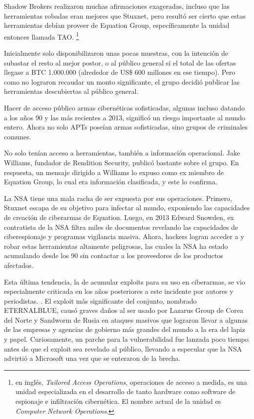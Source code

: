\documentclass{article}
\begin{document}
Shadow Brokers realizaron muchas afirmaciones exageradas, incluso que las herramientas robadas eran mejores que Stuxnet, pero resultó ser cierto que estas herramientas debían proveer de Equation Group, específicamente la unidad entonces llamada TAO. \footnote{en inglés, {\it Tailored Access Operations}, operaciones de acceso a medida, es una unidad especializada en el desarrollo de tanto hardware como software de espionaje e infiltración cibernética. El nombre actual de la unidad es {\it Computer Network Operations}.} \autocite{sophos-shadow-brokers}

Inicialmente solo disponibilizaron unas pocas muestras, con la intención de subastar el resto al mejor postor, o al público general si el total de las ofertas llegase a BTC 1.000.000 (alrededor de US\$ 600 millones en ese tiempo). Pero como no lograron recaudar un monto significante, el grupo decidió publicar las herramientas descubiertas al público general.

Hacer de acceso público armas cibernéticas sofisticadas, algunas incluso datando a los años 90 y las más recientes a 2013, significó un riesgo importante al mundo entero. Ahora no solo APTs poseían armas sofisticadas, sino grupos de criminales comunes.

No solo tenían acceso a herramientas, también a información operacional. Jake Williams, fundador de Rendition Security, publicó bastante sobre el grupo. En respuesta, un mensaje dirigido a Williams lo expuso como ex miembro de Equation Group, lo cual era información clasificada, y este lo confirma. \autocite{nytimes-shadow-brokers} \autocite{darknetdiaries-shadow-brokers}

La NSA tiene una mala racha de ser expuesta por sus operaciones. Primero, Stuxnet escapa de su objetivo para infectar al mundo, exponiendo las capacidades de creación de ciberarmas de Equation. Luego, en 2013 Edward Snowden, ex contratista de la NSA filtra miles de documentos revelando las capacidades de ciberespionaje y programas vigilancia masiva. Ahora, hackers logran acceder a y robar estas herramientas altamente peligrosas, las cuales la NSA ha estado acumulando desde los 90 sin contactar a los proveedores de los productos afectados.

Esta última tendencia, la de acumular exploits para su uso en ciberarmas, se vio especialmente criticada en los años posteriores a este incidente por autores y periodistas. \autocite{schneier-shadow-brokers}. El exploit más significante del conjunto, nombrado ETERNALBLUE, causó graves daños al ser usado por Lazarus Group de Corea del Norte y Sandworm de Rusia en ataques masivos que lograron llevar a algunas de las empresas y agencias de gobierno más grandes del mundo a la era del lapiz y papel. Curiosamente, un parche para la vulnerabilidad fue lanzada poco tiempo antes de que el exploit sea revelado al público, llevando a especular que la NSA advirtió a Microsoft una vez que se enteraron de la brecha.
\end{document}
